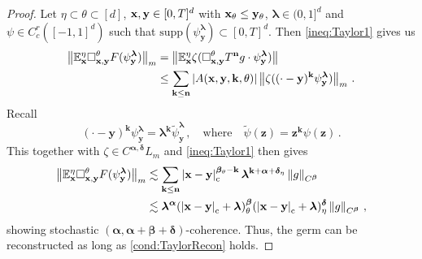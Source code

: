 \documentclass[12pt]{article}
\numberwithin{equation}{section}
\theoremstyle{plain}
\theoremstyle{definition}
\newcommand{\abs}[1]{\left\vert #1 \right\vert}
\newcommand{\compAbs}[1]{\left\vert#1\right\vert_{\text{c}}}
\newcommand{\norm}[1]{\left\Vert #1\right\Vert}
\def\bE{\mathbb{E}}\def\bW{\mathbb{W}}
\def\fk{\mathbf k}\def\fl{\mathbf l}
\def\fy{\mathbf y}\def\fz{\mathbf z}
\def\falpha{{\boldsymbol\alpha}}
\def\fbeta{{\boldsymbol\beta}}
\def\fdelta{{\boldsymbol\delta}}
\def\flambda{{\boldsymbol\lambda}}
\def\supp{\mbox{supp}}
\begin{document}
\begin{proof}
    Let $\eta\subset\theta\subset[d]$, $\fx,\fy\in[0,T]^d$ with $\fx_\theta\le\fy_\theta$, $\flambda\in(0,1]^d$ and $\psi\in C_c^r([-1,1]^d)$ such that $\supp(\psi_\fy^\flambda)\subset[0,T]^d$. Then \eqref{ineq:Taylor1} gives us
    \begin{align*}
        \norm{\bE_\fx^\eta\square^\theta_{\fx,\fy} F(\psi_\fy^\flambda)}_m &= \norm{\bE^\eta_\fx \zeta(\square^\theta_{\fx,\fy}T^{\fn}g\cdot\psi_\fy^\flambda )} \\
        &\le \sum_{\fk\le\fn} \abs{A(\fx,\fy,\fk,\theta)} \norm{\zeta((\cdot-\fy)^\fk\psi_\fy^\flambda)}_m\,.
    \end{align*}
    Recall 
    \[
    (\cdot-\fy)^\fk\psi_\fy^\flambda = \flambda^\fk\tilde\psi_\fy^\flambda\,,\quad\text{where}\quad \tilde\psi(\fz) = \fz^\fk\psi(\fz)\,.
    \]
    This together with $\zeta\in C^{\falpha,\fdelta}L_m$ and \eqref{ineq:Taylor1} then gives
    \begin{align*}
        \norm{\bE_\fx^\eta\square^\theta_{\fx,\fy} F(\psi_\fy^\flambda)}_m &\lesssim \sum_{\fk\le\fn}\compAbs{\fx-\fy}^{\fbeta_\theta-\fk} \flambda^{\fk+\falpha+\fdelta_\eta}\norm{g}_{C^\fbeta}\\
        &\lesssim \flambda^{\falpha}(\compAbs{\fx-\fy}+\flambda)^{\fbeta}_\theta (\compAbs{\fx-\fy}+\flambda)^{\fdelta}_\eta \norm{g}_{C^\fbeta}\,,
    \end{align*}
    showing stochastic $(\falpha,\falpha+\fbeta+\fdelta)$-coherence. Thus, the germ can be reconstructed as long as \eqref{cond:TaylorRecon} holds.


\end{proof}
\end{document}
